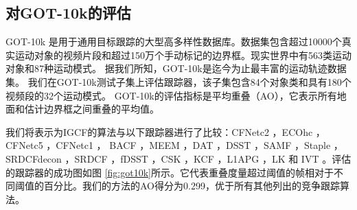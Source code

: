 \subsection{对GOT-10k的评估}
GOT-10k \cite{GOT-10k} 是用于通用目标跟踪的大型高多样性数据库。数据集包含超过10000个真实运动对象的视频片段和超过150万个手动标记的边界框。现实世界中有563类运动对象和87种运动模式。
据我们所知，GOT-10k是迄今为止最丰富的运动轨迹数据集。
我们在GOT-10k测试子集上评估跟踪器，该子集包含84个对象类和具有180个视频段的32个运动模式。
GOT-10k的评估指标是平均重叠（AO），它表示所有地面和估计边界框之间重叠的平均值。

我们将表示为IGCF的算法与以下跟踪器进行了比较：CFNetc2 \cite{Valmadre2017EndtoEndRL}，ECOhc \cite{Danelljan2017ECOEC}，CFNetc5 \cite{Valmadre2017EndtoEndRL}，CFNetc1 \cite{Valmadre2017EndtoEndRL}， BACF \cite{Galoogahi2017LearningBC}，MEEM \cite{Zhang2014MEEMRT}，DAT \cite{Possegger2015InDO}，DSST \cite{Danelljan2014AccurateSE}，SAMF \cite{Li2014ASA}，Staple \cite{Bertinetto2016StapleC}，SRDCFdecon \cite{Danelljan2016AdaptiveDO}，SRDCF \cite{Danelljan2015LearningSR}，fDSST \cite{Danelljan2017DiscriminativeSS}，CSK \cite{Henriques2012ExploitingTC}，KCF \cite{henriques2014high-speed}，L1APG \cite{Bao2012RealTR}，LK \cite{Shi1994GoodFT} 和 IVT \cite{Ross2007IncrementalLF}。评估的跟踪器的成功图如图 \ref{fig:got10k}所示。它代表重叠度量超过阈值的帧相对于不同阈值的百分比。我们的方法的AO得分为0.299，优于所有其他列出的竞争跟踪算法。

